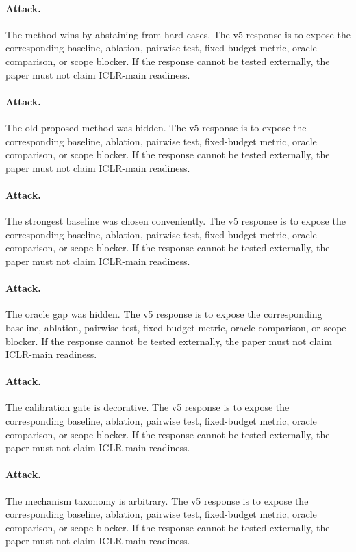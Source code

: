 \documentclass{article}
\begin{document}
\paragraph{Attack.} The method wins by abstaining from hard cases. The v5 response is to expose the corresponding baseline, ablation, pairwise test, fixed-budget metric, oracle comparison, or scope blocker. If the response cannot be tested externally, the paper must not claim ICLR-main readiness.
\paragraph{Attack.} The old proposed method was hidden. The v5 response is to expose the corresponding baseline, ablation, pairwise test, fixed-budget metric, oracle comparison, or scope blocker. If the response cannot be tested externally, the paper must not claim ICLR-main readiness.
\paragraph{Attack.} The strongest baseline was chosen conveniently. The v5 response is to expose the corresponding baseline, ablation, pairwise test, fixed-budget metric, oracle comparison, or scope blocker. If the response cannot be tested externally, the paper must not claim ICLR-main readiness.
\paragraph{Attack.} The oracle gap was hidden. The v5 response is to expose the corresponding baseline, ablation, pairwise test, fixed-budget metric, oracle comparison, or scope blocker. If the response cannot be tested externally, the paper must not claim ICLR-main readiness.
\paragraph{Attack.} The calibration gate is decorative. The v5 response is to expose the corresponding baseline, ablation, pairwise test, fixed-budget metric, oracle comparison, or scope blocker. If the response cannot be tested externally, the paper must not claim ICLR-main readiness.
\paragraph{Attack.} The mechanism taxonomy is arbitrary. The v5 response is to expose the corresponding baseline, ablation, pairwise test, fixed-budget metric, oracle comparison, or scope blocker. If the response cannot be tested externally, the paper must not claim ICLR-main readiness.
\end{document}
